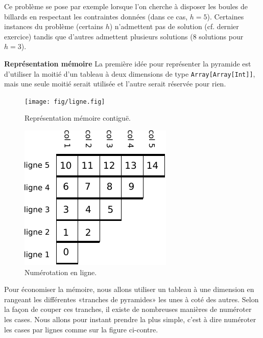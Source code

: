 \documentclass[10pt]{article}\usepackage[correction,nu]{esial}
\begin{document}
\noindent Ce problème se pose par exemple lorsque l'on cherche à disposer les
boules de billards en respectant les contraintes données (dans ce cas,
$h=5$). Certaines instances du problème (certains $h$) n'admettent pas de
solution (cf. dernier exercice) tandis que d'autres admettent plusieurs
solutions (8 solutions pour $h=3$).

\begin{Exercice}\textbf{Représentation mémoire}
  \noindent La première idée pour représenter la pyramide est d'utiliser la
  moitié d'un tableau à deux dimensions de type \texttt{Array[Array[Int]]}, mais
  une seule moitié serait utilisée et l'autre serait réservée pour rien.
\end{Exercice}

\begin{figure}[h]
  \centering
  \texttt{[image: fig/ligne.fig]}\vspace{-.5\baselineskip}
  \caption{Représentation mémoire contiguë.}
  \label{fig:mem}%
\end{figure}

\begin{figure}
  \vspace{-1.2\baselineskip}
  \centerline{\includegraphics[scale=.9]{img/numerotation-ligne.pdf}}
  \vspace{-.5\baselineskip}
  \caption{Numérotation en ligne.}
  \label{fig:numligne}
  \vspace{-1.5\baselineskip}
  
\end{figure}

Pour économiser la mémoire, nous allons utiliser un tableau à une dimension en
rangeant les différentes «tranches de pyramides» les unes à coté des
autres. Selon la façon de couper ces tranches, il existe de nombreuses manières
de numéroter les cases. Nous allons pour instant prendre la plus simple, c'est à
dire numéroter les cases par lignes comme sur la figure ci-contre.
\end{document}
